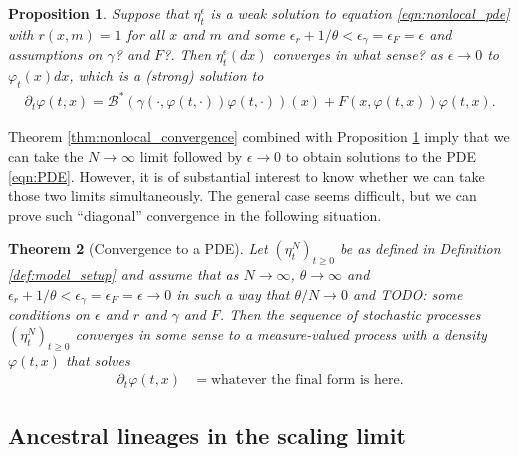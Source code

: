\documentclass[12pt]{article}
\newtheorem{theorem}{Theorem}[section]
\newtheorem{proposition}[theorem]{Proposition}
\newcommand{\DG}{\mathcal{B}}  %
\newcommand{\comment}[1]{{\color{blue} \it #1}}
\begin{document}
\begin{proposition}
    \label{prop:nonlocal_to_local}
    Suppose that $\eta^\epsilon_t$ is a weak solution to equation \eqref{eqn:nonlocal_pde}
    with $r(x, m) = 1$ for all $x$ and $m$
    and some $\epsilon_r + 1/\theta < \epsilon_\gamma = \epsilon_F = \epsilon$
    \comment{and assumptions on $\gamma$? and $F$?}.
    Then $\eta^\epsilon_t(dx)$ converges \comment{in what sense?} as $\epsilon \to 0$
    to $\varphi_t(x) dx$, which is a (strong) solution to
    \begin{align} \label{eqn:PDE}
        \partial_t \varphi(t, x)
        =
        \DG^* \left( \gamma(\cdot, \varphi(t, \cdot)) \varphi(t, \cdot)  \right)(x)
        + F(x, \varphi(t, x)) \varphi(t, x) .
    \end{align}
\end{proposition}

Theorem \ref{thm:nonlocal_convergence} combined with Proposition \ref{prop:nonlocal_to_local}
imply that we can take the $N \to \infty$ limit
followed by $\epsilon \to 0$
to obtain solutions to the PDE \eqref{eqn:PDE}.
However, it is of substantial interest to know whether
we can take those two limits simultaneously.
The general case seems difficult,
but we can prove such ``diagonal'' convergence in the following situation.

\begin{theorem}[Convergence to a PDE]
    \label{thm:local_convergence}
    Let $(\eta^N_t)_{t \geq 0}$
    be as defined in Definition \ref{def:model_setup}
    and assume that as $N \to \infty$, $\theta \to \infty$
    and $\epsilon_r + 1/\theta < \epsilon_\gamma = \epsilon_F = \epsilon \to 0$
    in such a way that $\theta/N \to 0$
    and
    \comment{TODO: some conditions on $\epsilon$ and $r$ and $\gamma$ and $F$}.
    Then the sequence of stochastic processes $(\eta^N_t)_{t \ge 0}$
    converges \comment{in some sense}
    to a measure-valued process with a density $\varphi(t, x)$
    that solves
    \begin{align}
        \partial_t \varphi(t, x)
        &=
        \text{whatever the final form is here} .
    \end{align}
\end{theorem}


\subsection{Ancestral lineages in the scaling limit}
\end{document}
